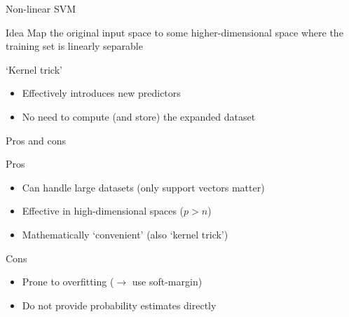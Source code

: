 \begin{frame}{Non\hyp{}linear SVM}
    \begin{block}{Idea}
        Map the original input space to some higher\hyp{}dimensional space
        where the training set is linearly separable
    \end{block}
    \vfill
    \begin{block}{`Kernel trick'}
        \begin{itemize}
            \item Effectively introduces new predictors
            \item \alert{No need to compute (and store) the expanded dataset}
        \end{itemize}
    \end{block}
\end{frame}

\begin{frame}{Pros and cons}
    \begin{block}{Pros}
        \begin{itemize}
            \item Can handle large datasets (only support vectors matter)
            \item Effective in high\hyp{}dimensional spaces ($p > n$)
            \item Mathematically `convenient' (also `kernel trick')
        \end{itemize}
    \end{block}
    \vfill
    \begin{block}{Cons}
        \begin{itemize}
            \item Prone to overfitting ($\rightarrow$ use soft\hyp{}margin)
            \item Do not provide probability estimates directly
        \end{itemize}
    \end{block}
\end{frame}



